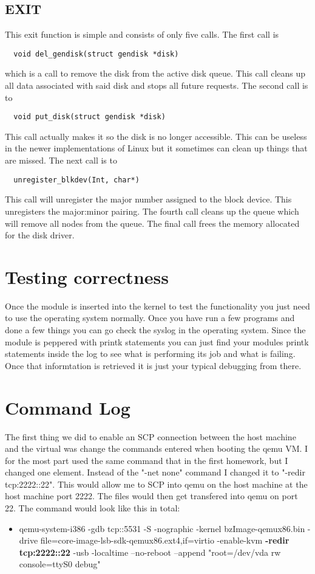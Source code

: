 \documentclass[onecolumn, draftclsnofoot,10pt, compsoc]{IEEEtran}
\begin{document}
    \subsection{EXIT}
    
    This exit function is simple and consists of only five calls. The first call is \begin{verbatim}  void del_gendisk(struct gendisk *disk) \end{verbatim} which is a call to remove the disk from the active disk queue. This call cleans up all data associated with said disk and stops all future requests. The second call is to \begin{verbatim}  void put_disk(struct gendisk *disk) \end{verbatim} This call actually makes it so the disk is no longer accessible. This can be useless in the newer implementations of Linux but it sometimes can clean up things that are missed. The next call is to \begin{verbatim}  unregister_blkdev(Int, char*) \end{verbatim} This call will unregister the major number assigned to the block device. This unregisters the major:minor pairing. The fourth call cleans up the queue which will remove all nodes from the queue. The final call frees the memory allocated for the disk driver.

    
    \section{Testing correctness}
    
    Once the module is inserted into the kernel to test the functionality you just need to use the operating system normally. Once you have run a few programs and done a few things you can go check the syslog in the operating system. Since the module is peppered with printk statements you can just find your modules printk statements inside the log to see what is performing its job and what is failing. Once that informtation is retrieved it is just your typical debugging from there.

    \section{Command Log}
        The first thing we did to enable an SCP connection between the host machine and the virtual was change the commands entered when booting the qemu VM. I for the most part used the same command that in the first homework, but I changed one element. Instead of the "-net none" command I changed it to "-redir tcp:2222::22". This would allow me to SCP into qemu on the host machine at the host machine port 2222. The files would then get transfered into qemu on port 22. The command would look like this in total: 
    \begin{itemize}
    \item qemu-system-i386 -gdb tcp::5531 -S -nographic -kernel bzImage-qemux86.bin -drive file=core-image-lsb-sdk-qemux86.ext4,if=virtio -enable-kvm \textbf{-redir tcp:2222::22} -usb -localtime --no-reboot --append "root=/dev/vda rw console=ttyS0 debug"
    \end{itemize}
    
\end{document}
